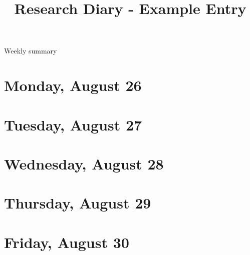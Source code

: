 \documentclass[11pt,letterpaper]{article}
\begin{document}
\univlogo

\title{Research Diary - Example Entry}

{\Huge Weekly summary}\\[5mm]

\section*{Monday, August 26}

\section*{Tuesday, August 27}

\section*{Wednesday, August 28}

\section*{Thursday, August 29}

\section*{Friday, August 30}

\printbibliography
\end{document}
